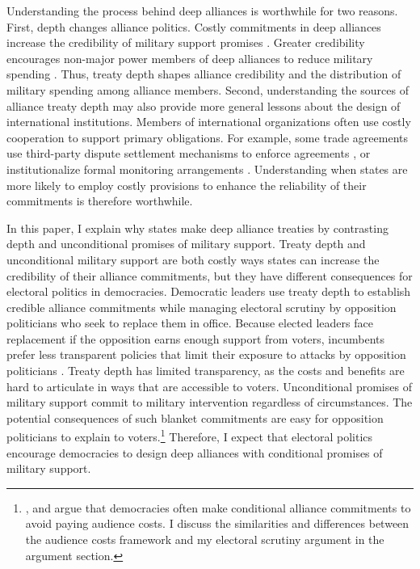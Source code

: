 \documentclass[12pt]{article}
\begin{document}
Understanding the process behind deep alliances is worthwhile for two reasons.
First, depth changes alliance politics. 
Costly commitments in deep alliances increase the credibility of military support promises \citep{Morrow1994}. 
Greater credibility encourages non-major power members of deep alliances to reduce military spending \citep{Alley2020}.  
Thus, treaty depth shapes alliance credibility and the distribution of military spending among alliance members.
Second, understanding the sources of alliance treaty depth may also provide more general lessons about the design of international institutions. 
Members of international organizations often use costly cooperation to support primary obligations. 
For example, some trade agreements use third-party dispute settlement mechanisms to enforce agreements \citep{Smith2000}, or institutionalize formal monitoring arrangements \citep{Duretal2013}.  
Understanding when states are more likely to employ costly provisions to enhance the reliability of their commitments is therefore worthwhile. 


In this paper, I explain why states make deep alliance treaties by contrasting depth and unconditional promises of military support. 
Treaty depth and unconditional military support are both costly ways states can increase the credibility of their alliance commitments, but they have different consequences for electoral politics in democracies. 
Democratic leaders use treaty depth to establish credible alliance commitments while managing electoral scrutiny by opposition politicians who seek to replace them in office.
Because elected leaders face replacement if the opposition earns enough support from voters, incumbents prefer less transparent policies that limit their exposure to attacks by opposition politicians \citep{Kono2006}.
Treaty depth has limited transparency, as the costs and benefits are hard to articulate in ways that are accessible to voters. 
Unconditional promises of military support commit to military intervention regardless of circumstances.  
The potential consequences of such blanket commitments are easy for opposition politicians to explain to voters.\footnote{\citet{Mattes2012}, \citet{Chibaetal2015} and \citet{FjelstulReiter2019} argue that democracies often make conditional alliance commitments to avoid paying audience costs. I discuss the similarities and differences between the audience costs framework and my electoral scrutiny argument in the argument section.} 
Therefore, I expect that electoral politics encourage democracies to design deep alliances with conditional promises of military support. 
\end{document}
